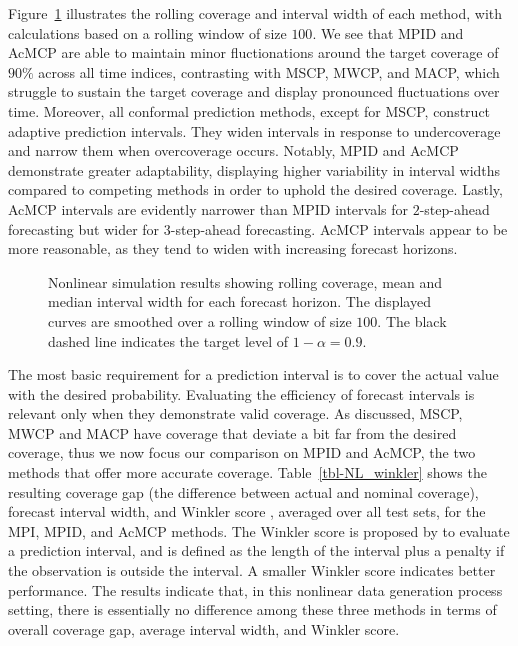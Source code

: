 \documentclass[
  11pt,
  a4paper,
]{article}
\theoremstyle{plain}
\theoremstyle{plain}
\theoremstyle{remark}
\begin{document}
Figure~\ref{fig-NL_cov} illustrates the rolling coverage and interval
width of each method, with calculations based on a rolling window of
size \(100\). We see that MPID and AcMCP are able to maintain minor
fluctionations around the target coverage of \(90\%\) across all time
indices, contrasting with MSCP, MWCP, and MACP, which struggle to
sustain the target coverage and display pronounced fluctuations over
time. Moreover, all conformal prediction methods, except for MSCP,
construct adaptive prediction intervals. They widen intervals in
response to undercoverage and narrow them when overcoverage occurs.
Notably, MPID and AcMCP demonstrate greater adaptability, displaying
higher variability in interval widths compared to competing methods in
order to uphold the desired coverage. Lastly, AcMCP intervals are
evidently narrower than MPID intervals for \(2\)-step-ahead forecasting
but wider for \(3\)-step-ahead forecasting. AcMCP intervals appear to be
more reasonable, as they tend to widen with increasing forecast
horizons.

\begin{figure}


\caption{\label{fig-NL_cov}Nonlinear simulation results showing rolling
coverage, mean and median interval width for each forecast horizon. The
displayed curves are smoothed over a rolling window of size \(100\). The
black dashed line indicates the target level of \(1-\alpha=0.9\).}

\end{figure}%

The most basic requirement for a prediction interval is to cover the
actual value with the desired probability. Evaluating the efficiency of
forecast intervals is relevant only when they demonstrate valid
coverage. As discussed, MSCP, MWCP and MACP have coverage that deviate a
bit far from the desired coverage, thus we now focus our comparison on
MPID and AcMCP, the two methods that offer more accurate coverage.
Table~\ref{tbl-NL_winkler} shows the resulting coverage gap (the
difference between actual and nominal coverage), forecast interval
width, and Winkler score \autocite{winkler1972}, averaged over all test
sets, for the MPI, MPID, and AcMCP methods. The Winkler score is
proposed by \textcite{winkler1972} to evaluate a prediction interval,
and is defined as the length of the interval plus a penalty if the
observation is outside the interval. A smaller Winkler score indicates
better performance. The results indicate that, in this nonlinear data
generation process setting, there is essentially no difference among
these three methods in terms of overall coverage gap, average interval
width, and Winkler score.
\end{document}
